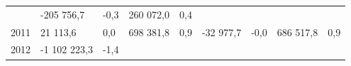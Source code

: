 \begin{longtable}[]{@{}lllllllll@{}}
\begin{minipage}[t]{0.06\columnwidth}
\end{minipage} & \begin{minipage}[t]{0.12\columnwidth}\raggedright
-205 756,7\strut
\end{minipage} & \begin{minipage}[t]{0.06\columnwidth}\raggedright
-0,3\strut
\end{minipage} & \begin{minipage}[t]{0.10\columnwidth}\raggedright
260 072,0\strut
\end{minipage} & \begin{minipage}[t]{0.06\columnwidth}\raggedright
0,4\strut
\end{minipage}\tabularnewline
\begin{minipage}[t]{0.05\columnwidth}\raggedright
2011\strut
\end{minipage} & \begin{minipage}[t]{0.10\columnwidth}\raggedright
21 113,6\strut
\end{minipage} & \begin{minipage}[t]{0.06\columnwidth}\raggedright
0,0\strut
\end{minipage} & \begin{minipage}[t]{0.16\columnwidth}\raggedright
698 381,8\strut
\end{minipage} & \begin{minipage}[t]{0.06\columnwidth}\raggedright
0,9\strut
\end{minipage} & \begin{minipage}[t]{0.12\columnwidth}\raggedright
-32 977,7\strut
\end{minipage} & \begin{minipage}[t]{0.06\columnwidth}\raggedright
-0,0\strut
\end{minipage} & \begin{minipage}[t]{0.10\columnwidth}\raggedright
686 517,8\strut
\end{minipage} & \begin{minipage}[t]{0.06\columnwidth}\raggedright
0,9\strut
\end{minipage}\tabularnewline
\begin{minipage}[t]{0.05\columnwidth}\raggedright
2012\strut
\end{minipage} & \begin{minipage}[t]{0.10\columnwidth}\raggedright
-1 102 223,3\strut
\end{minipage} & \begin{minipage}[t]{0.06\columnwidth}\raggedright
-1,4\strut
\end{minipage} & \begin{minipage}[t]{0.16\columnwidth}\raggedright

\end{minipage}
\end{longtable}
